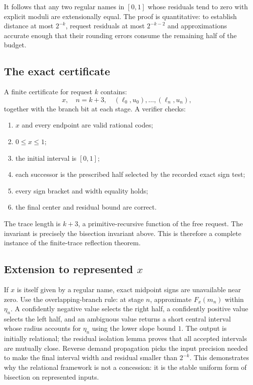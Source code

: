 It follows that any two regular names in \([0,1]\) whose residuals tend to
zero with explicit moduli are extensionally equal.  The proof is quantitative:
to establish distance at most \(2^{-k}\), request residuals at most
\(2^{-k-2}\) and approximations accurate enough that their rounding errors
consume the remaining half of the budget.

\subsection{The exact certificate}

A finite certificate for request \(k\) contains:
\[
  x,\quad n=k+3,\quad
  (\ell_0,u_0),\ldots,(\ell_n,u_n),
\]
together with the branch bit at each stage.  A verifier checks:
\begin{enumerate}[label=(\roman*)]
\item \(x\) and every endpoint are valid rational codes;
\item \(0\le x\le1\);
\item the initial interval is \([0,1]\);
\item each successor is the prescribed half selected by the recorded exact
      sign test;
\item every sign bracket and width equality holds;
\item the final center and residual bound are correct.
\end{enumerate}
The trace length is \(k+3\), a primitive-recursive function of the free
request.  The invariant is precisely the bisection invariant above.  This is
therefore a complete instance of the finite-trace reflection theorem.

\subsection{Extension to represented \(x\)}

If \(x\) is itself given by a regular name, exact midpoint signs are
unavailable near zero.  Use the overlapping-branch rule:
at stage \(n\), approximate \(F_x(m_n)\) within \(\eta_n\).  A confidently
negative value selects the right half, a confidently positive value selects
the left half, and an ambiguous value returns a short central interval whose
radius accounts for \(\eta_n\) using the lower slope bound \(1\).
The output is initially relational; the residual isolation lemma proves that
all accepted intervals are mutually close.  Reverse demand propagation picks
the input precision needed to make the final interval width and residual
smaller than \(2^{-k}\).  This demonstrates why the relational framework is
not a concession: it is the stable uniform form of bisection on represented
inputs.
